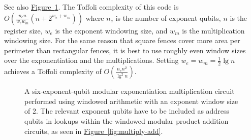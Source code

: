 \documentclass[onecolumn,unpublished]{quantumarticle}
\theoremstyle{definition}
\theoremstyle{definition}
\theoremstyle{definition}
\newcommand{\fig}[1]{\hyperref[fig:#1]{Figure~\ref*{fig:#1}}}
\begin{document}
See also \fig{exponentiation}.
The Toffoli complexity of this code is $O(\frac{n_e n}{w_e w_m} (n + 2^{w_e + w_m}))$ where $n_e$ is the number of exponent qubits, $n$ is the register size, $w_e$ is the exponent windowing size, and $w_m$ is the multiplication windowing size.
For the same reason that square fences cover more area per perimeter than rectangular fences, it is best to use roughly even window sizes over the exponentiation and the multiplications.
Setting $w_e=w_m=\frac{1}{2}\lg n$ achieves a Toffoli complexity of $O(\frac{n_e n^2}{\lg^2 n})$.


\begin{figure}[h]
    \caption{
    \label{fig:exponentiation}
    A six-exponent-qubit modular exponentiation multiplication circuit performed using windowed arithmetic with an exponent window size of 2.
    The relevant exponent qubits have to be included as address qubits in lookups within the windowed modular product addition circuits, as seen in \fig{multiply-add}.
    }
\end{figure}
\end{document}
